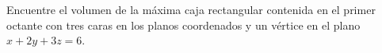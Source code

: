 \item Encuentre el volumen de la máxima caja rectangular contenida en el primer octante con tres caras en los planos coordenados y un vértice en el plano $x + 2y + 3z = 6$.
